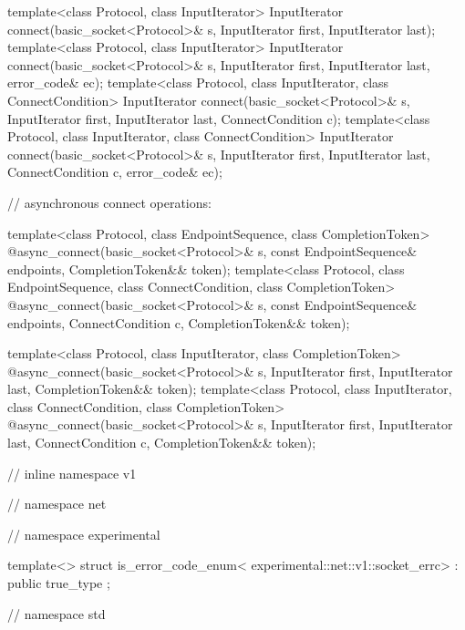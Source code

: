 \begin{codeblock}
{{{{  template<class Protocol, class InputIterator>
    InputIterator connect(basic_socket<Protocol>& s,
                          InputIterator first, InputIterator last);
  template<class Protocol, class InputIterator>
    InputIterator connect(basic_socket<Protocol>& s,
                          InputIterator first, InputIterator last,
                          error_code& ec);
  template<class Protocol, class InputIterator, class ConnectCondition>
    InputIterator connect(basic_socket<Protocol>& s,
                          InputIterator first, InputIterator last,
                          ConnectCondition c);
  template<class Protocol, class InputIterator, class ConnectCondition>
    InputIterator connect(basic_socket<Protocol>& s,
                          InputIterator first, InputIterator last,
                          ConnectCondition c,
                          error_code& ec);

  // asynchronous connect operations:

  template<class Protocol, class EndpointSequence, class CompletionToken>
    @\DEDUCED@ async_connect(basic_socket<Protocol>& s,
                          const EndpointSequence& endpoints,
                          CompletionToken&& token);
  template<class Protocol, class EndpointSequence, class ConnectCondition,
           class CompletionToken>
    @\DEDUCED@ async_connect(basic_socket<Protocol>& s,
                          const EndpointSequence& endpoints,
                          ConnectCondition c,
                          CompletionToken&& token);

  template<class Protocol, class InputIterator, class CompletionToken>
    @\DEDUCED@ async_connect(basic_socket<Protocol>& s,
                          InputIterator first, InputIterator last,
                          CompletionToken&& token);
  template<class Protocol, class InputIterator, class ConnectCondition,
           class CompletionToken>
    @\DEDUCED@ async_connect(basic_socket<Protocol>& s,
                          InputIterator first, InputIterator last,
                          ConnectCondition c,
                          CompletionToken&& token);

} // inline namespace v1
} // namespace net
} // namespace experimental

  template<> struct is_error_code_enum<
    experimental::net::v1::socket_errc>
      : public true_type {};

} // namespace std
\end{codeblock}

